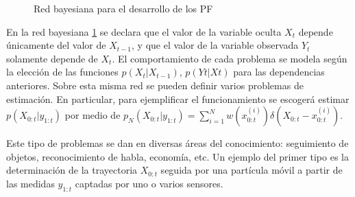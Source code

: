 \begin{figure}[ht]
    \centering
    \caption{Red bayesiana para el desarrollo de los PF}
    \label{fig:3.7}
\end{figure}


En la red bayesiana \ref{fig:3.7} se declara que el valor de la variable oculta $X_{t}$ depende únicamente del valor de $X_{t-1}$, y que el valor de la variable observada $Y_{t}$ solamente depende de $X_{t}$. El comportamiento de cada problema se modela según la elección de las funciones $p\left(X_{t}|X_{t-1}\right)$, $p\left(Y{t}|X{t}\right)$ para las dependencias anteriores. Sobre esta misma red se pueden definir varios problemas de estimación. En particular, para ejemplificar el funcionamiento se escogerá estimar $p\left(X_{0:t}|y_{1:t}\right)$ por medio de $p_{N}\left(X_{0:t}|y_{1:t}\right) = \displaystyle \sum_{i=1}^{N} w\left(x_{0:t}^{(i)}\right) \delta\left(X_{0:t} - x_{0:t}^{(i)}\right)$.

Este tipo de problemas se dan en diversas áreas del conocimiento: seguimiento de objetos, reconocimiento de habla, economía, etc. Un ejemplo del primer tipo es la determinación de la trayectoria $X_{0:t}$ seguida por una
partícula móvil a partir de las medidas $y_{1:t}$ captadas por uno o varios sensores.

